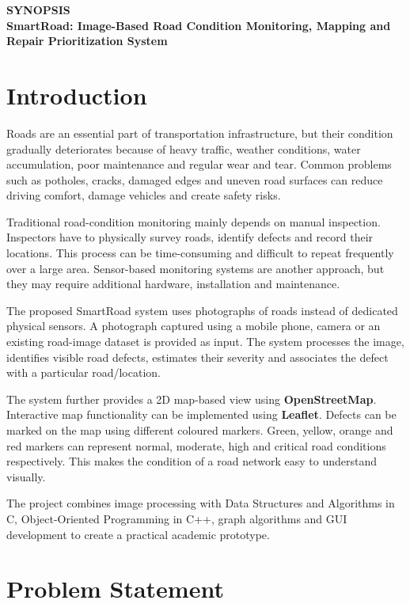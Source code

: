 \documentclass[12pt,a4paper]{article}
\begin{document}
\begin{center}
    {\LARGE \textbf{SYNOPSIS}}\\[0.5cm]
    {\Large \textbf{SmartRoad: Image-Based Road Condition Monitoring, Mapping and Repair Prioritization System}}
\end{center}

\section{Introduction}

Roads are an essential part of transportation infrastructure, but their condition gradually deteriorates because of heavy traffic, weather conditions, water accumulation, poor maintenance and regular wear and tear. Common problems such as potholes, cracks, damaged edges and uneven road surfaces can reduce driving comfort, damage vehicles and create safety risks.

Traditional road-condition monitoring mainly depends on manual inspection. Inspectors have to physically survey roads, identify defects and record their locations. This process can be time-consuming and difficult to repeat frequently over a large area. Sensor-based monitoring systems are another approach, but they may require additional hardware, installation and maintenance.

The proposed SmartRoad system uses photographs of roads instead of dedicated physical sensors. A photograph captured using a mobile phone, camera or an existing road-image dataset is provided as input. The system processes the image, identifies visible road defects, estimates their severity and associates the defect with a particular road/location.

The system further provides a 2D map-based view using \textbf{OpenStreetMap}. Interactive map functionality can be implemented using \textbf{Leaflet}. Defects can be marked on the map using different coloured markers. Green, yellow, orange and red markers can represent normal, moderate, high and critical road conditions respectively. This makes the condition of a road network easy to understand visually.

The project combines image processing with Data Structures and Algorithms in C, Object-Oriented Programming in C++, graph algorithms and GUI development to create a practical academic prototype.

\section{Problem Statement}
\end{document}
